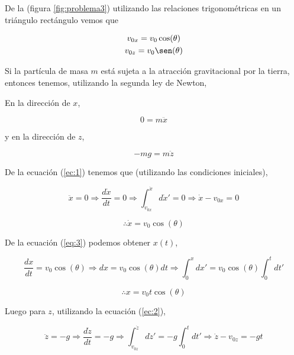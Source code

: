 \documentclass[a4paper,10pt]{article}
\begin{document}
\vspace{.3cm}

De la (figura \ref{fig:problema3}) utilizando las relaciones trigonométricas en un 
triángulo rectángulo vemos que

\begin{gather*}
v_{0x} = v_0\cos(\theta) \\
v_{0z} = v_0\sen(\theta)
\end{gather*}


Si la partícula de masa $m$ está sujeta a la atracción gravitacional
por la tierra, entonces tenemos, utilizando la segunda ley de Newton,

\vspace{.3cm}

En la dirección de $x$,

\begin{equation}
 0 = m \ddot{x}
 \label{ec:1}
\end{equation}

y en la dirección de $z$,

\begin{equation}
 - mg = m \ddot{z}
  \label{ec:2}
\end{equation}

De la ecuación (\ref{ec:1}) tenemos que (utilizando las condiciones iniciales),

\begin{equation*}
 \ddot{x} = 0 \Rightarrow \frac{d\dot{x}}{dt} = 0 \Rightarrow 
 \int_{v_{0x}}^{\dot{x}}d\dot{x}' = 0 \Rightarrow \dot{x} - v_{0x} = 0 
 \end{equation*}

\begin{equation}
 \therefore \dot{x} = v_0 \cos(\theta)
 \label{eq:3}
\end{equation}

De la ecuación (\ref{eq:3}) podemos obtener $x(t)$, 

\begin{equation*}
 \frac{dx}{dt} = v_0 \cos(\theta) \Rightarrow dx = v_0 \cos(\theta) dt \Rightarrow
 \int_0^x dx' = v_0 \cos(\theta) \int_0^t dt'
\end{equation*}

\begin{equation}
 \therefore x = v_0 t \cos(\theta)
 \label{eq:4}
\end{equation}

Luego para $z$, utilizando la ecuación (\ref{ec:2}),

\begin{equation*}
 \ddot{z} = -g \Rightarrow \frac{d\dot{z}}{dt} = -g \Rightarrow 
 \int_{v_{0z}}^{\dot{z}}d\dot{z}' = -g \int_0^t dt' \Rightarrow \dot{z} - v_{0z} = -gt 
 \end{equation*}
 
\end{document}
